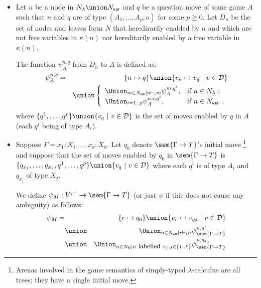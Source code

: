 \begin{definition}\hfill
\label{def:psi mapping}

    \begin{itemize}[-]
    \item Let $n$ be a node in $N_\lambda \union N_{\sf var}$ and $q$ be a question move of some game $A$
such that $n$ and $q$ are of type $(A_1,\ldots,A_p,o)$ for some
$p\geq 0$. Let $D_n$ be the set of nodes and leaves form $N$
that heredirarily enabled by $n$ and which are not free
variables in $\kappa(n)$ nor hereditarily enabled by a free
variable in $\kappa(n)$.

The function $\psi^{n,q}_A$ from $D_n$ to $A$ is defined as:
        \begin{eqnarray*}
        \psi^{n,q}_A &=& \{ n \mapsto q \} \union  \{ v_n \mapsto v_q \ | \ v \in \mathcal{D} \}\\
         &&\union \left\{
                        \begin{array}{ll}
                          \Union_{m \in N_{\sf var} | n \vdash_i m} \psi^{m, q^i}_A, & \hbox{if $n\in N_{\lambda}$\ ;} \\
                          \Union_{i=1..p} \psi^{n.i, q^i}_A, & \hbox{if $n\in N_{\sf var}$\ .}
                        \end{array}
                      \right.
        \end{eqnarray*}
        where $\{ q^1, \ldots, q^p \} \union \{ v_q \ | \ v \in \mathcal{D} \}$ is the set of moves enabled by $q$ in $A$ (each $q^i$ being of type $A_i$).

    \item Suppose $\Gamma = x_1:X_1, \ldots ,
    x_k:X_k$. Let $q_0$ denote $\sem{\Gamma\rightarrow T}$'s
    initial move \footnote{Arenas involved in the game semantics
    of simply-typed $\lambda$-calculus are all trees: they have
    a single initial move.} and suppose that the set of moves
    enabled by $q_0$ in $\sem{\Gamma\rightarrow T}$ is
     $\{ q_{x_1}, \ldots, q_{x_k}, q^1, \ldots, q^p \} \union \{
    v_q \ | \ v \in \mathcal{D} \}$ where each $q^i$ is of type
    $A_i$ and $q_{x_j}$ of type $X_j$.

    We define $\psi_M : V^{r\vdash} \rightarrow
    \sem{\Gamma\rightarrow T}$ (or just $\psi$ if this does not
    cause any ambiguity) as follows:
    \begin{eqnarray*}
     \psi_M = && \{ r \mapsto q_0 \}  \union  \{ v_r \mapsto v_{q_0} \ | \ v \in \mathcal{D} \}\\
& \union& \Union_{n \in N_{\sf var} | r \vdash_i n} \psi^{n, q^i}_\sem{\Gamma\rightarrow T} \\
& \union& \Union_{n \in N_{\sf fv} | n \mbox{ \small labelled } x_j, j \in \{ 1..k \} } \psi^{n, q_{x_j}}_\sem{\Gamma\rightarrow T}
    \end{eqnarray*}
    \end{itemize}
\end{definition}

